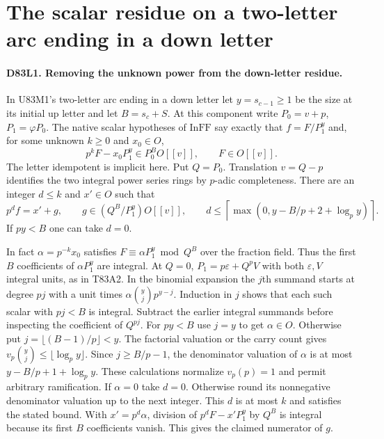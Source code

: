 \section{The scalar residue on a two-letter arc ending in a down letter}

\paragraph{D83L1. Removing the unknown power from the down-letter residue.}
In U83M1's two-letter arc ending in a down letter let
$y=s_{c-1}\ge1$ be the size at its initial up letter and let
$B=s_c+S$. At this component write $P_0=v+p$, $P_1=\varphi P_0$.
The native scalar hypotheses of $\mathrm{InFF}$ say exactly that
$f=F/P_1^y$ and, for some unknown $k\ge0$ and $x_0\in O$,
\[
                 p^k F-x_0P_1^y\in P_0^B O[[v]],
                 \qquad F\in O[[v]] .
\]
The letter idempotent is implicit here. Put $Q=P_0$. Translation
$v=Q-p$ identifies the two integral power series rings by
$p$-adic completeness. There are an integer $d\le k$ and
$x'\in O$ such that
\[
      p^d f=x'+g,\qquad g\in (Q^B/P_1^y)O[[v]],
      \qquad
      d\le\left\lceil\max(0,y-B/p+2+\log_p y)\right\rceil .
\]
If $py<B$ one can take $d=0$.

In fact $\alpha=p^{-k}x_0$ satisfies
$F\equiv\alpha P_1^y\bmod Q^B$ over the fraction field.
Thus the first $B$ coefficients of $\alpha P_1^y$ are integral.
At $Q=0$, $P_1=p\varepsilon+Q^p V$ with both
$\varepsilon,V$ integral units, as in T83A2. In the binomial
expansion the $j$th summand starts at degree $pj$ with a unit
times $\alpha\binom yj p^{y-j}$. Induction in $j$ shows that
each such scalar with $pj<B$ is integral. Subtract the earlier
integral summands before inspecting the coefficient of $Q^{pj}$.
For $py<B$ use $j=y$ to get $\alpha\in O$. Otherwise put
$j=\lfloor(B-1)/p\rfloor<y$. The factorial valuation or the
carry count gives $v_p\binom yj\le\lfloor\log_p y\rfloor$.
Since $j\ge B/p-1$, the denominator valuation of $\alpha$ is at
most $y-B/p+1+\log_p y$. These calculations normalize
$v_p(p)=1$ and permit arbitrary ramification. If $\alpha=0$
take $d=0$. Otherwise round its nonnegative denominator
valuation up to the next integer. This $d$ is at most $k$ and
satisfies the stated bound. With $x'=p^d\alpha$, division of
$p^dF-x'P_1^y$ by $Q^B$ is integral because its first $B$
coefficients vanish. This gives the claimed numerator of $g$.

